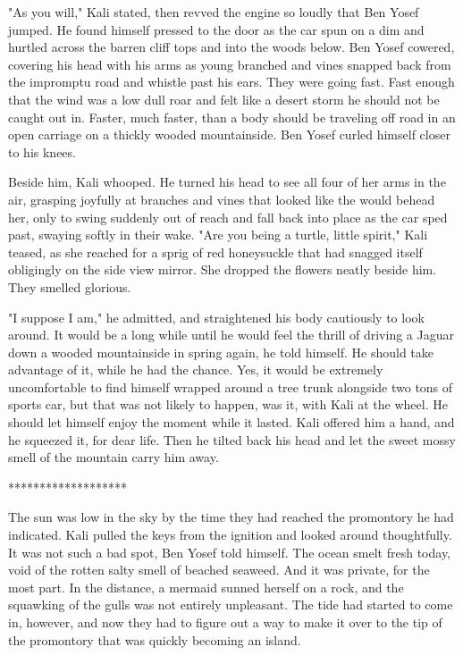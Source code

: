 \documentclass{amsart}
\begin{document}
"As you will," Kali stated, then revved the engine so loudly that Ben Yosef jumped. He found himself pressed to the door as the car spun on a dim and hurtled across the barren cliff tops and into the woods below. Ben Yosef cowered, covering his head with his arms as young branched and vines snapped back from the impromptu road and whistle past his ears. They were going fast. Fast enough that the wind was a low dull roar and felt like a desert storm he should not be caught out in. Faster, much faster, than a body should be traveling off road in an open carriage on a thickly wooded mountainside. Ben Yosef curled himself closer to his knees.

Beside him, Kali whooped. He turned his head to see all four of her arms in the air, grasping joyfully at branches and vines that looked like the would behead her, only to swing suddenly out of reach and fall back into place as the car sped past, swaying softly in their wake. "Are you being a turtle, little spirit," Kali teased, as she reached for a sprig of red honeysuckle that had snagged itself obligingly on the side view mirror. She dropped the flowers neatly beside him. They smelled glorious.

"I suppose I am," he admitted, and straightened his body cautiously to look around. It would be a long while until he would feel the thrill of driving a Jaguar down a wooded mountainside in spring again, he told himself. He should take advantage of it, while he had the chance. Yes, it would be extremely uncomfortable to find himself wrapped around a tree trunk alongside two tons of sports car, but that was not likely to happen, was it, with Kali at the wheel. He should let himself enjoy the moment while it lasted. Kali offered him a hand, and he squeezed it, for dear life. Then he tilted back his head and let the sweet mossy smell of the mountain carry him away.

\begin{center} ******************* \end{center} 

The sun was low in the sky by the time they had reached the promontory he had indicated. Kali pulled the keys from the ignition and looked around thoughtfully. It was not such a bad spot, Ben Yosef told himself. The ocean smelt fresh today, void of the rotten salty smell of beached seaweed. And it was private, for the most part. In the distance, a mermaid sunned herself on a rock, and the squawking of the gulls was not entirely unpleasant. The tide had started to come in, however, and now they had to figure out a way to make it over to the tip of the promontory that was quickly becoming an island.
\end{document}
